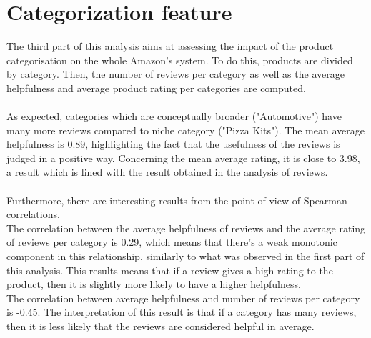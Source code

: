 \documentclass[11pt]{article}
\begin{document}
\section{Categorization feature}
The third part of this analysis aims at assessing the impact of the product categorisation on the whole Amazon's system. To do this, products are divided by category. Then, the number of reviews per category as well as the average helpfulness and average product rating per categories are computed.\\\\
As expected, categories which are conceptually broader ("Automotive") have many more reviews compared to niche category ("Pizza Kits"). The mean average helpfulness is 0.89, highlighting the fact that the usefulness of the reviews is judged in a positive way. Concerning the mean average rating, it is close to 3.98, a result which is lined with the result obtained in the analysis of reviews.\\\\
Furthermore, there are interesting results from the point of view of Spearman correlations.\\
The correlation between the average helpfulness of reviews and the average rating of reviews per category is 0.29, which means that there's a weak monotonic component in this relationship, similarly to what was observed in the first part of this analysis. This results means that if a review gives a high rating to the product, then it is slightly more likely to have a higher helpfulness.  \\
The correlation between average helpfulness and number of reviews per category is -0.45. The interpretation of this result is that if a category has many reviews, then it is less likely that the reviews are considered helpful in average. \\
\end{document}
